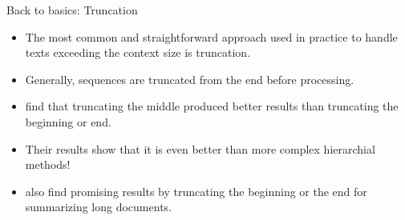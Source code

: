 \begin{frame}{Back to basics: Truncation}

\begin{itemize}
	\item The most common and straightforward approach used in practice to handle texts
	exceeding the context size is truncation.
	\item Generally, sequences are truncated from the end before processing.
	\item \citet{sun2019fine} find that truncating the middle produced better results
	than truncating the beginning or end.
	\item Their results show that it is even better than more complex hierarchial
	methods!
	\item \citet{worsham-kalita-2018-genre} also find promising results by truncating
	the beginning or the end for summarizing long documents.
\end{itemize}

\end{frame}
